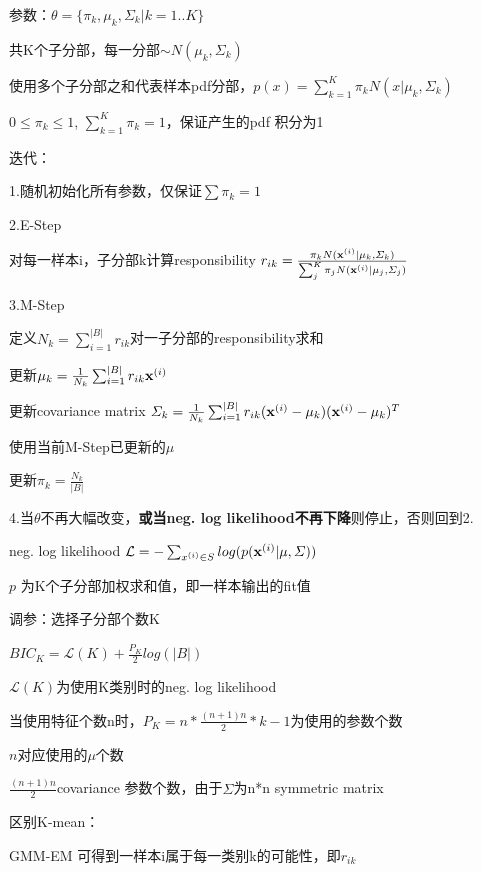 \documentclass[UTF8]{ctexart}
\begin{document}
  参数：$\theta = \{ \pi_k, \mu_k, \varSigma_k | k = 1..K\}$
  
  \quad \quad 共K个子分部，每一分部$\sim N(\mu_k, \varSigma_k)$
  
  使用多个子分部之和代表样本pdf分部，$p(x) = \sum_{k=1}^{K} \pi_kN(x|\mu_k, \varSigma_k)$

  \quad $0 \leq \pi_k \leq 1$, $\sum_{k=1}^{K}\pi_k = 1$，保证产生的pdf 积分为1

  迭代：

  \quad 1.随机初始化所有参数，仅保证$\sum \pi_k = 1$

  \quad 2.E-Step 

  \quad \quad 对每一样本i，子分部k计算responsibility $r_{ik} = \frac{\pi_kN({\bf x}^{(i)} | \mu_k, \varSigma_k)}{\sum_j^K\pi_jN({\bf x}^{(i)} | \mu_j, \varSigma_j)}$

  \quad 3.M-Step

  \quad \quad 定义$N_k = \sum_{i=1}^{|B|} r_{ik}$对一子分部的responsibility求和

  \quad \quad 更新$\mu_k = \frac{1}{N_k}\sum_{i=1}^{|B|}r_{ik}{\bf x}^{(i)}$

  \quad \quad 更新covariance matrix $\varSigma_k = \frac{1}{N_k}\sum_{i=1}^{|B|}r_{ik}({\bf x}^{(i)} - \mu_k)({\bf x}^{(i)} - \mu_k)^T$

  \quad \quad \quad 使用当前M-Step已更新的$\mu$

  \quad \quad 更新$\pi_k = \frac{N_k}{|B|}$

  \quad 4.当$\theta$不再大幅改变，\textbf{或当neg. log likelihood不再下降}则停止，否则回到2.

  \quad \quad neg. log likelihood $\mathcal{L} = -\sum_{x^{(i)} \in S} log(p({\bf x}^{(i)}|\mu, \varSigma))$

  \quad \quad \quad $p$ 为K个子分部加权求和值，即一样本输出的fit值

  调参：选择子分部个数K

  \quad $BIC_K = \mathcal{L}(K) + \frac{P_K}{2}log(|B|)$

  \quad \quad $\mathcal{L}(K)$为使用K类别时的neg. log likelihood

  \quad \quad 当使用特征个数n时，$P_K = n * \frac{(n+1)n}{2} * k - 1$为使用的参数个数

  \quad \quad \quad $n$对应使用的$\mu$个数

  \quad \quad \quad $\frac{(n+1)n}{2}$covariance 参数个数，由于$\varSigma$为n*n symmetric matrix

  区别K-mean：

  \quad GMM-EM 可得到一样本i属于每一类别k的可能性，即$r_{ik}$
\end{document}
